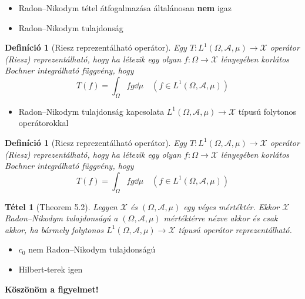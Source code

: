 \documentclass{beamer} %
\newtheorem{theo}[lem]{Tétel}
\newtheorem{defi}[lem]{Definíció}
\begin{document}
\begin{frame}
\justifying
\begin{itemize}
\item Radon\---Nikodym tétel átfogalmazása általánosan \textbf{nem} igaz
\pause \item Radon\---Nikodym tulajdonság
\end{itemize}
\pause \begin{defi}[Riesz reprezentálható operátor] Egy $T \colon L^1(\Omega, \mathcal{A}, \mu) \to \mathcal{X}$ operátor (Riesz) reprezentálható, hogy ha létezik egy olyan $f\colon \Omega \to \mathcal{X}$ lényegében korlátos Bochner integrálható függvény, hogy
$$T(f) = \int_{\Omega} fg \dd{\mu} \quad(f \in L^1(\Omega, \mathcal{A}, \mu))$$
\end{defi}
\begin{itemize}
\pause \item Radon\---Nikodym tulajdonság kapcsolata $L^1(\Omega, \mathcal{A}, \mu) \to \mathcal{X}$ típusú folytonos operátorokkal
\end{itemize}
\end{frame}
\begin{frame}
\justifying
\begin{defi}[Riesz reprezentálható operátor] Egy $T \colon L^1(\Omega, \mathcal{A}, \mu) \to \mathcal{X}$ operátor (Riesz) reprezentálható, hogy ha létezik egy olyan $f\colon \Omega \to \mathcal{X}$ lényegében korlátos Bochner integrálható függvény, hogy
$$T(f) = \int_{\Omega} fg \dd{\mu} \quad(f \in L^1(\Omega, \mathcal{A}, \mu))$$
\end{defi}
\begin{theo}[Theorem 5.2] Legyen $\mathcal{X}$ és $(\Omega, \mathcal{A}, \mu)$ egy véges mértéktér. Ekkor $\mathcal{X}$ Radon\---Nikodym tulajdonságú a $(\Omega, \mathcal{A}, \mu)$ mértéktérre nézve akkor és csak akkor, ha bármely folytonos $L^1(\Omega, \mathcal{A}, \mu) \to \mathcal{X}$ típusú operátor reprezentálható.
\end{theo}
\begin{itemize}
\pause \item $c_0$ nem Radon\---Nikodym tulajdonságú
\pause \item Hilbert-terek igen
\end{itemize}
\end{frame}
\begin{frame}
\center
\textbf{Köszönöm a figyelmet!}
\end{frame}
\end{document}
